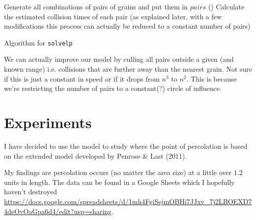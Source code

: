 \documentclass{article}
\begin{document}
\begin{algorithm}[H]

    Generate all combinations of pairs of grains and put them in $pairs$
    ()\;
    Calculate the estimated collision times of each pair
    (as explained later,
    with a few modifications this process can actually be reduced
    to a constant number of pairs)\;
    \caption{Algorithm for \texttt{solvelp}}
\end{algorithm}

We can actually improve our model by culling all pairs outside a given (and
known range) i.e. collisions that are further away than the nearest grain.
Not sure if this is just a constant in speed or if it drops from $n^3$ to
$n^2$. This is because we're restricting the number of
pairs to a constant(?) circle of influence.

\section{Experiments}
I have decided to use the model to study where the point of percolation is
based on the extended model developed by Penrose \& Last (2011).

My findings are percolation occurs (no matter the area size) at a little over
1.2 units in length. The data can be found in a Google Sheets which I hopefully
haven't destroyed
\url{https://docs.google.com/spreadsheets/d/1mh4FgiSejmOBHi7JJxv_7j2LBOEXD74deOvOaGpa6d4/edit?usp=sharing}.
\end{document}
